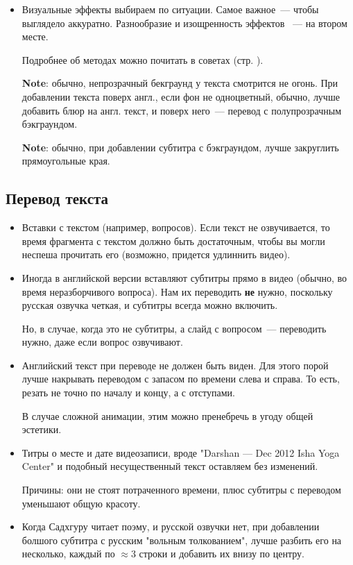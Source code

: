 \documentclass[
a4paper, %
12pt, %
article,
onecolumn, %
openany, %
]{memoir}
\begin{document}
\begin{itemize}
  \item Визуальные эффекты выбираем по ситуации.
        Самое важное~--- чтобы выглядело аккуратно. Разнообразие и изощренность
        эффектов ~--- на втором месте.

        Подробнее об методах можно почитать в советах (стр. \pageref{advices}).

        \textbf{Note}: обычно, непрозрачный бекграунд у текста
        смотрится не огонь. При добавлении текста поверх англ.,
        если фон не одноцветный, обычно, лучше добавить блюр на англ.
        текст, и поверх него~--- перевод с полупрозрачным бэкграундом.

        \textbf{Note}: обычно, при добавлении субтитра с
        бэкграундом, лучше закруглить прямоугольные края.
\end{itemize}



\subsection{Перевод текста}

\begin{itemize}

  \item Вставки с текстом (например, вопросов). Если текст не озвучивается,
        то время фрагмента с текстом должно быть достаточным, чтобы вы могли
        неспеша прочитать его (возможно, придется удлиннить видео).

  \item Иногда в английской версии вставляют субтитры прямо в видео
        {\color{gray}(обычно, во время неразборчивого вопроса)}. Нам их переводить
        \textbf{не} нужно, поскольку русская озвучка четкая,
        и субтитры всегда можно включить.

        Но, в случае, когда это не субтитры, а слайд с вопросом~---
        переводить нужно, даже если вопрос озвучивают.
  \item Английский текст при переводе не должен быть виден. Для этого порой лучше
        накрывать переводом с запасом по времени слева и справа. То есть, резать
        не точно по началу и концу, а с отступами.

        В случае сложной анимации, этим можно пренебречь в угоду общей эстетики.


  \item Титры о месте и дате видеозаписи, вроде "Darshan — Dec 2012
        Isha Yoga Center" и подобный несущественный текст оставляем без изменений.

        {\color{gray} Причины: они не стоят потраченного времени, плюс
        субтитры с переводом уменьшают  общую красоту.}

  \item Когда Садхгуру читает поэму, и русской озвучки нет, при добавлении
        болшого субтитра с русским "вольным толкованием", лучше разбить его на
        несколько, каждый
        по $\approx 3$ строки и добавить их внизу по центру.

\end{itemize}
\end{document}
